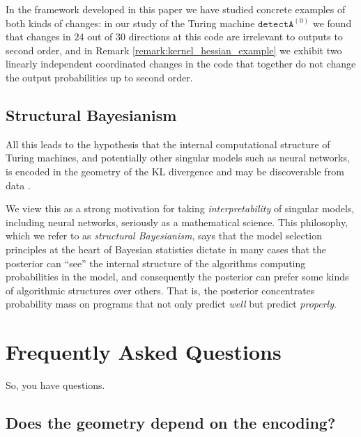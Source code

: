 \documentclass[english,letter paper,12pt,reqno]{article}
\theoremstyle{definition}
\newcommand{\detectA}{\texttt{detectA}}
\begin{document}
In the framework developed in this paper we have studied concrete examples of both kinds of changes: in our study of the Turing machine $\detectA^{(0)}$ we found that changes in $24$ out of $30$ directions at this code are irrelevant to outputs to second order, and in Remark \ref{remark:kernel_hessian_example} we exhibit two linearly independent coordinated changes in the code that together do not change the output probabilities up to second order.

\subsection{Structural Bayesianism}\label{sec:structural_bayesianism}

All this leads to the hypothesis that the internal computational structure of Turing machines, and potentially other singular models such as neural networks, is encoded in the geometry of the KL divergence and may be discoverable from data \cite{lau2024locallearningcoefficientsingularityaware,hoogland2024developmental,wang2024differentiation}. 

We view this as a strong motivation for taking \emph{interpretability} of singular models, including neural networks, seriously as a mathematical science. This philosophy, which we refer to as \emph{structural Bayesianism}, says that the model selection principles at the heart of Bayesian statistics dictate in many cases that the posterior can ``see'' the internal structure of the algorithms computing probabilities in the model, and consequently the posterior can prefer some kinds of algorithmic structures over others. That is, the posterior concentrates probability mass on programs that not only predict \emph{well} but predict \emph{properly}. 

\begingroup
\let\originalthebibliography\thebibliography
\renewcommand{\thebibliography}[1]{\originalthebibliography{#1}\setlength{\itemsep}{2pt}}


\endgroup

\appendix

\section{Frequently Asked Questions}\label{section:faq}

So, you have questions.

\subsection{Does the geometry depend on the encoding?}
\end{document}
